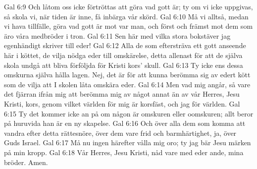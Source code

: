 Gal 6:9  Och låtom oss icke förtröttas att göra vad gott är; ty om vi icke uppgivas, så skola vi, när tiden är inne, få inbärga vår skörd.
Gal 6:10  Må vi alltså, medan vi hava tillfälle, göra vad gott är mot var man, och först och främst mot dem som äro våra medbröder i tron.
Gal 6:11  Sen här med vilka stora bokstäver jag egenhändigt skriver till eder!
Gal 6:12  Alla de som eftersträva ett gott anseende här i köttet, de vilja nödga eder till omskärelse, detta allenast för att de själva skola undgå att bliva förföljda för Kristi kors' skull.
Gal 6:13  Ty icke ens dessa omskurna själva hålla lagen. Nej, det är för att kunna berömma sig av edert kött som de vilja att I skolen låta omskära eder.
Gal 6:14  Men vad mig angår, så vare det fjärran ifrån mig att berömma mig av något annat än av vår Herres, Jesu Kristi, kors, genom vilket världen för mig är korsfäst, och jag för världen.
Gal 6:15  Ty det kommer icke an på om någon är omskuren eller oomskuren; allt beror på huruvida han är en ny skapelse.
Gal 6:16  Och över alla dem som komma att vandra efter detta rättesnöre, över dem vare frid och barmhärtighet, ja, över Guds Israel.
Gal 6:17  Må nu ingen härefter vålla mig oro; ty jag bär Jesu märken på min kropp.
Gal 6:18  Vår Herres, Jesu Kristi, nåd vare med eder ande, mina bröder. Amen.


